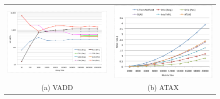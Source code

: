 \documentclass[runningheads]{llncs}
\begin{document}
\begin{figure}[htp]
{\small
\centering
\begin{tabular}{cc}

\begin{minipage}[b]{.515\textwidth}
\includegraphics[width=\textwidth]{figures/vadd_bgp.eps}
\end{minipage}
&
\begin{minipage}[b]{.515\textwidth}
\includegraphics[width=\textwidth]{figures/atax.eps}
\end{minipage}\\

(a) VADD & (b) ATAX \\


\end{tabular}}
\end{figure}
\end{document}

